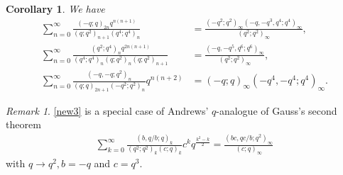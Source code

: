 \documentclass[reqno,12pt]{amsart}
\newtheorem{corollary}[theorem]{Corollary}
\theoremstyle{remark}
\newtheorem{remark}{Remark}
\numberwithin{equation}{section}
\begin{document}
\begin{corollary}
We have
\begin{align}
\sum_{n=0}^{\infty}\frac{\left(-q;q\right)_{2n}q^{n\left(n+1\right)}}
{\left(q;q^2\right)_{n+1}\left(q^4;q^4\right)_{n}}
&=\frac{\left(-q^2;q^2\right)_{\infty}\left(-q,-q^3,q^4;q^4\right)_{\infty}}
{\left(q^2;q^2\right)_{\infty}},\tag{S.11}\label{S.11}\\
\sum_{n=0}^{\infty}\frac{\left(q^2;q^4\right)_nq^{2n\left(n+1\right)}}
{\left(q^4;q^4\right)_{n}\left(q;q^2\right)_{n}\left(q;q^2\right)_{n+1}}
&=\frac{\left(-q,-q^5,q^6;q^6\right)_{\infty}}
{\left(q^2;q^2\right)_{\infty}},\tag{S.27\, and\, S.87}\label{S.87}\\
\sum_{n=0}^{\infty}\frac{\left(-q,-q;q^2\right)_n}
{\left(q;q\right)_{2n+1}\left(-q^2;q^2\right)_{n}}q^{n\left(n+2\right)}
&=\left(-q;q\right)_{\infty}\left(-q^4,-q^4;q^4\right)_{\infty}
.\label{new3}
\end{align}
\end{corollary}
\begin{remark}
\eqref{new3} is a special case of Andrews' $q$-analogue of Gauss's second theorem \cite[Eq. (1.9)]{Andrews_1973} 
\begin{align*}
\sum_{k=0}^{\infty}\frac{\left(b,q/b;q\right)_k}{\left(q^2;q^2\right)_k\left(c;q\right)_k}c^kq^{\frac{k^2-k}{2}}=
\frac{\left(bc,qc/b;q^2\right)_{\infty}}{\left(c;q\right)_{\infty}}
\end{align*}
with $q\to q^2, b=-q$ and $c=q^3$. 
\end{remark}
\end{document}
